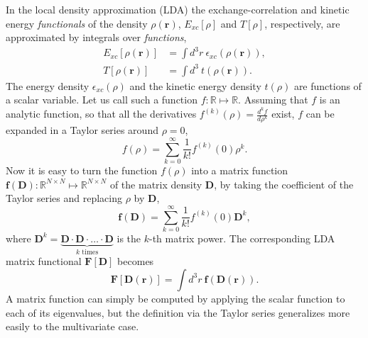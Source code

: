 \documentclass[journal=jpclcd,manuscript=letter]{achemso}
\newcommand\m[1]{\mathbf{#1}}
\renewcommand\vec[1]{\mathbf{#1}}
\begin{document}
In the local density approximation (LDA) the exchange-correlation and kinetic energy \emph{functionals} of the density $\rho(\vec{r})$,
$E_{xc}[\rho]$ and $T[\rho]$, respectively,
are approximated by integrals over \emph{functions},
\begin{align}
  E_{xc}[\rho(\vec{r})] &= \int d^3\!r ~ \epsilon_{xc}(\rho(\vec{r})), \\
  T[\rho(\vec{r})] &= \int d^3\! ~ t(\rho(\vec{r})).
\end{align}
The energy density $\epsilon_{xc}(\rho)$ and the kinetic energy density $t(\rho)$ are functions
of a scalar variable. Let us call such a function $f: \mathbb{R} \mapsto \mathbb{R}$.
Assuming that $f$ is an analytic function, so that all the derivatives $f^{(k)}(\rho) = \frac{d^k f}{d\rho^k}$ exist,
$f$ can be expanded in a Taylor series around $\rho=0$,
\begin{equation}
 f(\rho) = \sum_{k=0}^{\infty} \frac{1}{k!} f^{(k)}(0) \rho^k.
\end{equation}
Now it is easy to turn the function $f(\rho)$ into a matrix function $\m{f}(\m{D}) : \mathbb{R}^{N \times N} \mapsto \mathbb{R}^{N \times N}$
of the matrix density $\m{D}$, by taking the coefficient of the Taylor series and replacing $\rho$ by $\m{D}$,
\begin{equation}
 \m{f}(\m{D}) = \sum_{k=0}^{\infty} \frac{1}{k!} f^{(k)}(0) \m{D}^k,
\end{equation}
where $\m{D}^k = \underbrace{\m{D} \cdot \m{D} \cdot \ldots \cdot \m{D}}_{\text{$k$ times}}$ is the $k$-th matrix power.
The corresponding LDA matrix functional $\m{F}[\m{D}]$ becomes
\begin{equation}
 \m{F}[\m{D}(\vec{r})] = \int d^3\!r ~ \m{f}(\m{D}(\vec{r})).
\end{equation}
A matrix function can simply be computed by applying the scalar function to each of its eigenvalues, but the definition
via the Taylor series generalizes more easily to the multivariate case.
\end{document}
